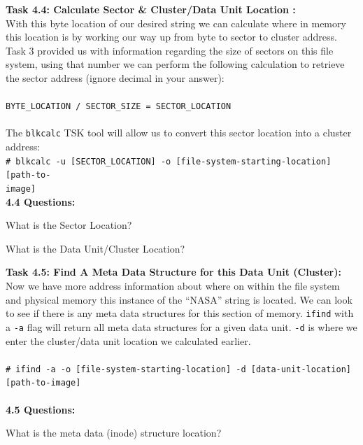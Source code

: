 \documentclass[a4paper,11pt]{article}
\begin{document}
{\noindent
\textbf{Task 4.4: Calculate Sector {\&} Cluster/Data Unit Location :}\\
With this byte location of our desired string we can calculate where in memory this location is by working our way up from byte to sector to cluster address.
Task 3 provided us with information regarding the size of sectors on this file system, using that number we can perform the following calculation to retrieve the sector address (ignore decimal in your answer):\\ \\ 
\texttt{BYTE\_LOCATION / SECTOR\_SIZE = SECTOR\_LOCATION}\\ \\
The \texttt{blkcalc} TSK tool will allow us to convert this sector location into a cluster address:\\

\noindent
\texttt{{\#} blkcalc -u [SECTOR\_LOCATION] -o [file-system-starting-location] [path-to-\\image]}
\\

\noindent
\textbf{4.4 Questions:}
\begin{enumerate*}
	\item What is the Sector Location?
	\item What is the Data Unit/Cluster Location?\\
\end{enumerate*}
}
{\noindent
\textbf{Task 4.5: Find A Meta Data Structure for this Data Unit (Cluster):}\\
Now we have more address information about where on within the file system and physical memory this instance of the ``NASA'' string is located. We can look to see if there is any meta data structures for this section of memory. \texttt{ifind} with a \texttt{-a} flag will return all meta data structures for a given data unit. \texttt{-d} is where we enter the cluster/data unit location we calculated earlier.\\ 
\\
\texttt{{\#} ifind -a -o [file-system-starting-location] -d [data-unit-location] [path-to-image] }\\
\\
\noindent
\textbf{4.5 Questions:}
\begin{enumerate*}
	\item What is the meta data (inode) structure location?\\
\end{enumerate*}
}
\end{document}
